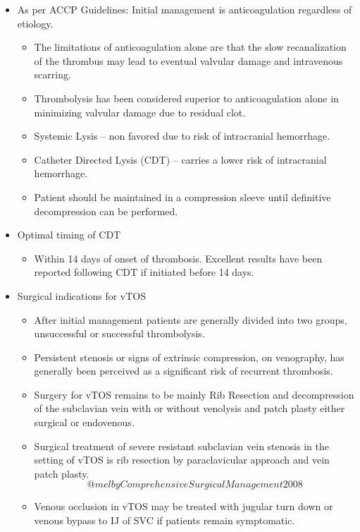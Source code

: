 \documentclass[
]{book}
\providecommand{\tightlist}{%
  \setlength{\itemsep}{0pt}\setlength{\parskip}{0pt}}
\begin{document}
\begin{itemize}
\item
  As per ACCP Guidelines: Initial management is anticoagulation
  regardless of etiology. \citep{kearonAntithromboticTherapyVTE2016}

  \begin{itemize}
  \item
    The limitations of anticoagulation alone are that the slow
    recanalization of the thrombus may lead to eventual valvular
    damage and intravenous scarring.
    \citep{sekharYearbookVascularEndovascular2018}
  \item
    Thrombolysis has been considered superior to anticoagulation
    alone in minimizing valvular damage due to residual clot.
    \citep{urschelSurgeryRemainsMost2008}
  \item
    Systemic Lysis -- non favored due to risk of intracranial
    hemorrhage. \citep{grunwaldCatheterDirectedThrombolysisTreatment2004}
  \item
    Catheter Directed Lysis (CDT) -- carries a lower risk of
    intracranial hemorrhage.
  \item
    Patient should be maintained in a compression sleeve until
    definitive decompression can be performed.
  \end{itemize}
\item
  Optimal timing of CDT

  \begin{itemize}
  \tightlist
  \item
    Within 14 days of onset of thrombosis. Excellent results have
    been reported following CDT if initiated before 14 days.
    \citep{wilsonFibrinolyticTherapyIdiopathic1990}
  \end{itemize}
\item
  Surgical indications for vTOS

  \begin{itemize}
  \item
    After initial management patients are generally divided into two
    groups, unsuccessful or successful thrombolysis.
  \item
    Persistent stenosis or signs of extrinsic compression, on
    venography, has generally been perceived as a significant risk
    of recurrent thrombosis.
  \item
    Surgery for vTOS remains to be mainly Rib Resection and
    decompression of the subclavian vein with or without venolysis
    and patch plasty either surgical or endovenous.
  \item
    Surgical treatment of severe resistant subclavian vein stenosis
    in the setting of vTOS is rib resection by paraclavicular
    approach and vein patch plasty.
    \[@melbyComprehensiveSurgicalManagement2008\]
  \item
    Venous occlusion in vTOS may be treated with jugular turn down
    or venous bypass to IJ of SVC if patients remain symptomatic.
    \citep{vemuriDiagnosisTreatmentEffortinduced2016}
  \end{itemize}
\end{itemize}
\end{document}
